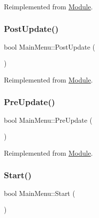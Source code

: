 Reimplemented from \mbox{\hyperlink{class_module_a77d7a006e42c0bd10110e1adbd4598cb}{Module}}.

\mbox{\label{class_main_menu_a39f02a2a3397937781de079abba13a5a}} 
\subsubsection{\texorpdfstring{PostUpdate()}{PostUpdate()}}
{\footnotesize\ttfamily bool Main\+Menu\+::\+Post\+Update (\begin{DoxyParamCaption}{ }\end{DoxyParamCaption})\hspace{0.3cm}{\ttfamily [virtual]}}



Reimplemented from \mbox{\hyperlink{class_module_afc355df351a4483850c3f512823ceebd}{Module}}.

\mbox{\label{class_main_menu_aba12dda658020b2394ec3449c92ae16e}} 
\subsubsection{\texorpdfstring{PreUpdate()}{PreUpdate()}}
{\footnotesize\ttfamily bool Main\+Menu\+::\+Pre\+Update (\begin{DoxyParamCaption}{ }\end{DoxyParamCaption})\hspace{0.3cm}{\ttfamily [virtual]}}



Reimplemented from \mbox{\hyperlink{class_module_a2c64af5917825500cf6f0497258bc398}{Module}}.

\mbox{\label{class_main_menu_a02d38874242aae89ce95925b5fad05f4}} 
\subsubsection{\texorpdfstring{Start()}{Start()}}
{\footnotesize\ttfamily bool Main\+Menu\+::\+Start (\begin{DoxyParamCaption}{ }\end{DoxyParamCaption})\hspace{0.3cm}{\ttfamily [virtual]}}



